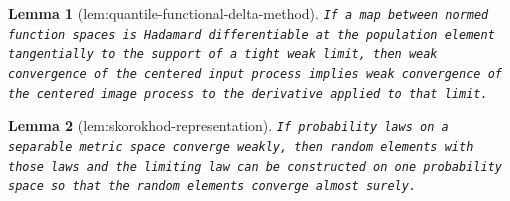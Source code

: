 \documentclass{article}
\newtheorem{lemma}{Lemma}
\begin{document}
\begin{lemma}[lem:quantile-functional-delta-method]\label{lem:quantile-functional-delta-method}
\texttt{If a map between normed function spaces is Hadamard differentiable at the population element tangentially to the support of a tight weak limit,\allowbreak{} then weak convergence of the centered input process implies weak convergence of the centered image process to the derivative applied to that limit.}
\end{lemma}

\begin{lemma}[lem:skorokhod-representation]\label{lem:skorokhod-representation}
\texttt{If probability laws on a separable metric space converge weakly,\allowbreak{} then random elements with those laws and the limiting law can be constructed on one probability space so that the random elements converge almost surely.}
\end{lemma}
\end{document}
